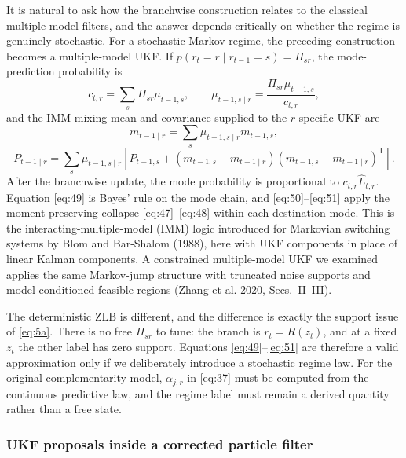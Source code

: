 \documentclass[11pt]{article}
\begin{document}
It is natural to ask how the branchwise construction relates to the classical
multiple-model filters, and the answer depends critically on whether the
regime is genuinely stochastic. For a stochastic Markov regime, the preceding
construction becomes a multiple-model UKF. If
$p(r_t=r\mid r_{t-1}=s)=\Pi_{sr}$, the mode-prediction probability is
\begin{equation}\label{eq:49}
 c_{t,r}=\sum_s\Pi_{sr}\mu_{t-1,s},
 \qquad
 \mu_{t-1,s\mid r}=\frac{\Pi_{sr}\mu_{t-1,s}}{c_{t,r}},
\end{equation}
and the IMM mixing mean and covariance supplied to the $r$-specific UKF are
\begin{equation}\label{eq:50}
 m_{t-1\mid r}=\sum_s\mu_{t-1,s\mid r}m_{t-1,s},
\end{equation}
\begin{equation}\label{eq:51}
 P_{t-1\mid r}=\sum_s\mu_{t-1,s\mid r}
 \left[P_{t-1,s}+
 (m_{t-1,s}-m_{t-1\mid r})(m_{t-1,s}-m_{t-1\mid r})^{\mathsf T}\right].
\end{equation}
After the branchwise update, the mode probability is proportional to
$c_{t,r}\widehat L_{t,r}$. Equation \eqref{eq:49} is Bayes' rule on the mode
chain, and \eqref{eq:50}--\eqref{eq:51} apply the moment-preserving collapse
\eqref{eq:47}--\eqref{eq:48} within each destination mode. This is the
interacting-multiple-model (IMM) logic introduced for Markovian switching
systems by Blom and Bar-Shalom (1988), here with UKF components in place of
linear Kalman components. A constrained multiple-model UKF we examined
applies the same Markov-jump structure with truncated noise supports and
model-conditioned feasible regions (Zhang et al. 2020, Secs.~II--III).

The deterministic ZLB is different, and the difference is exactly the
support issue of \eqref{eq:5a}. There is no free $\Pi_{sr}$ to tune: the
branch is $r_t=R(z_t)$, and at a fixed $z_t$ the other label has zero
support. Equations \eqref{eq:49}--\eqref{eq:51} are therefore a valid
approximation only if we deliberately introduce a stochastic regime law. For
the original complementarity model, $\alpha_{j,r}$ in \eqref{eq:37} must be
computed from the continuous predictive law, and the regime label must remain
a derived quantity rather than a free state.

\subsubsection{UKF proposals inside a corrected particle filter}
\label{sec:ukf-proposal}
\end{document}
